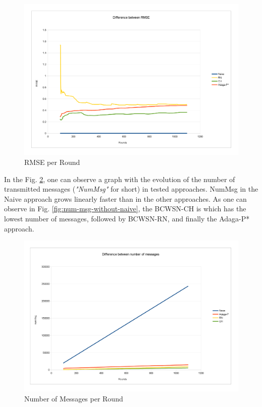 \documentclass[conference]{IEEEtran}
\begin{document}
\begin{figure}[!htb]
\centering
	\includegraphics[scale=0.09]{graf_RMSE_.png}
    \caption{RMSE per Round}
    \label{fig:rmse}
\end{figure}

In the Fig. \ref{fig:num-msg}, one can observe a graph with the evolution of the
number of transmitted messages ({\it "NumMsg"} for short) in tested approaches.
NumMsg in the Naive approach grows linearly faster than in the other approaches.
As one can observe in Fig. \ref{fig:num-msg-without-naive}, the BCWSN-CH is
which has the lowest number of messages, followed by BCWSN-RN, and finally the
Adaga-P* approach.

\begin{figure}[!htb]
\centering
	\includegraphics[scale=0.09]{graf_numMsg_.png}
    \caption{Number of Messages per Round}
    \label{fig:num-msg}
\end{figure}
\end{document}

